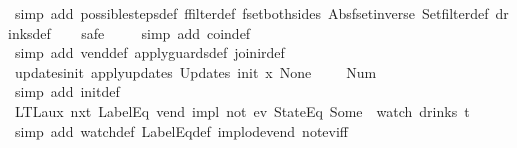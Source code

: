 \begin{isabellebody}
%
\isatagproof
{}\isamarkupfalse%
\ {\isacharparenleft}simp\ add{\isacharcolon}\ possible{\isacharunderscore}steps{\isacharunderscore}def\ ffilter{\isacharunderscore}def\ fset{\isacharunderscore}both{\isacharunderscore}sides\ Abs{\isacharunderscore}fset{\isacharunderscore}inverse\ Set{\isachardot}filter{\isacharunderscore}def\ drinks{\isacharunderscore}def{\isacharparenright}\isanewline
\ \ \isamarkupfalse%
\ safe\isanewline
\ \ \ \isamarkupfalse%
\ {\isacharparenleft}simp\ add{\isacharcolon}\ coin{\isacharunderscore}def{\isacharparenright}\isanewline
\ \ \isamarkupfalse%
\ {\isacharparenleft}simp\ add{\isacharcolon}\ vend{\isacharunderscore}def\ apply{\isacharunderscore}guards{\isacharunderscore}def\ join{\isacharunderscore}ir{\isacharunderscore}def{\isacharparenright}%
\endisatagproof
{\isafoldproof}%
%
\isadelimproof
\isanewline
%
\endisadelimproof
\isanewline
{}\isamarkupfalse%
\ updates{\isacharunderscore}init{\isacharcolon}\ {\isachardoublequoteopen}apply{\isacharunderscore}updates\ {\isacharparenleft}Updates\ init{\isacharparenright}\ {\isacharparenleft}{\isasymlambda}x{\isachardot}\ None{\isacharparenright}\ {\isacharless}{\isachargreater}\ {\isacharequal}\ {\isacharparenleft}{\isacharless}{\isachargreater}{\isacharparenleft}{}\ {\isacharcolon}{\isacharequal}\ Num\ {}{\isacharparenright}{\isacharparenright}{\isachardoublequoteclose}\isanewline
%
\isadelimproof
\ \ %
\endisadelimproof
%
\isatagproof
{}\isamarkupfalse%
\ {\isacharparenleft}simp\ add{\isacharcolon}\ init{\isacharunderscore}def{\isacharparenright}%
\endisatagproof
{\isafoldproof}%
%
\isadelimproof
\isanewline
%
\endisadelimproof
\isanewline
{}\isamarkupfalse%
\ LTL{\isacharunderscore}aux{}{\isacharcolon}\ {\isachardoublequoteopen}{\isacharparenleft}{\isacharparenleft}nxt\ {\isacharparenleft}LabelEq\ {\isacharprime}{\isacharprime}vend{\isacharprime}{\isacharprime}{\isacharparenright}{\isacharparenright}\ impl\ not\ {\isacharparenleft}ev\ {\isacharparenleft}StateEq\ {\isacharparenleft}Some\ {}{\isacharparenright}{\isacharparenright}{\isacharparenright}{\isacharparenright}\ {\isacharparenleft}watch\ drinks\ t{\isacharparenright}{\isachardoublequoteclose}\isanewline
%
\isadelimproof
\ \ %
\endisadelimproof
%
\isatagproof
{}\isamarkupfalse%
\ {\isacharparenleft}simp\ add{\isacharcolon}\ watch{\isacharunderscore}def\ LabelEq{\isacharunderscore}def\ implode{\isacharunderscore}vend\ not{\isacharunderscore}ev{\isacharunderscore}iff{\isacharparenright}\isanewline

\end{isabellebody}

